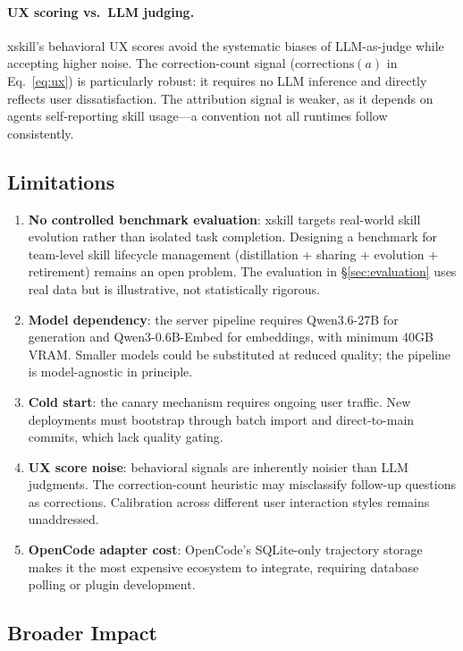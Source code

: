 \documentclass[11pt]{article}
\begin{document}
\paragraph{UX scoring vs.\ LLM judging.} xskill's behavioral UX scores avoid the systematic biases of LLM-as-judge while accepting higher noise. The correction-count signal ($\mathrm{corrections}(a)$ in Eq.~\ref{eq:ux}) is particularly robust: it requires no LLM inference and directly reflects user dissatisfaction. The attribution signal is weaker, as it depends on agents self-reporting skill usage---a convention not all runtimes follow consistently.

\subsection{Limitations}

\begin{enumerate}
    \item \textbf{No controlled benchmark evaluation}: xskill targets real-world skill evolution rather than isolated task completion. Designing a benchmark for team-level skill lifecycle management (distillation + sharing + evolution + retirement) remains an open problem. The evaluation in \S\ref{sec:evaluation} uses real data but is illustrative, not statistically rigorous.
    \item \textbf{Model dependency}: the server pipeline requires Qwen3.6-27B for generation and Qwen3-0.6B-Embed for embeddings, with minimum 40GB VRAM. Smaller models could be substituted at reduced quality; the pipeline is model-agnostic in principle.
    \item \textbf{Cold start}: the canary mechanism requires ongoing user traffic. New deployments must bootstrap through batch import and direct-to-main commits, which lack quality gating.
    \item \textbf{UX score noise}: behavioral signals are inherently noisier than LLM judgments. The correction-count heuristic may misclassify follow-up questions as corrections. Calibration across different user interaction styles remains unaddressed.
    \item \textbf{OpenCode adapter cost}: OpenCode's SQLite-only trajectory storage makes it the most expensive ecosystem to integrate, requiring database polling or plugin development.
\end{enumerate}

\subsection{Broader Impact}
\end{document}
